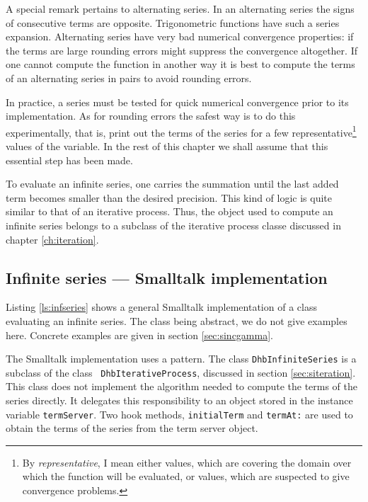 \documentclass[twoside]{book}
\begin{document}
A special remark pertains to alternating series. In an alternating
series the signs of consecutive terms are opposite. Trigonometric
functions have such a series expansion. Alternating series have
very bad numerical convergence properties: if the terms are large
rounding errors might suppress the convergence altogether. If one
cannot compute the function in another way it is best to compute
the terms of an alternating series in pairs to avoid rounding
errors.

In practice, a series must be tested for quick numerical
convergence prior to its implementation. As for rounding errors
the safest way is to do this experimentally, that is, print out
the terms of the series for a few representative\footnote{By {\sl
representative}, I mean either values, which are covering the
domain over which the function will be evaluated, or values, which
are suspected to give convergence problems.} values of the
variable. In the rest of this chapter we shall assume that this
essential step has been made.

To evaluate an infinite series, one carries the summation until
the last added term becomes smaller than the desired precision.
This kind of logic is quite similar to that of an iterative
process. Thus, the object used to compute an infinite series
belongs to a subclass of the iterative process classe discussed in
chapter \ref{ch:iteration}.

\subsection{Infinite series --- Smalltalk  implementation}
\label{sec:sseries}
Listing \ref{ls:infseries} shows a general Smalltalk
implementation of a class evaluating an infinite series. The class
being abstract, we do not give examples here. Concrete examples
are given in section \ref{sec:sincgamma}.

The Smalltalk implementation uses a  pattern.
The class {\tt DhbInfiniteSeries} is a subclass of the class {\tt
DhbIterativeProcess}, discussed in section \ref{sec:siteration}.
This class does not implement the algorithm needed to compute the
terms of the series directly. It delegates this responsibility to
an object stored in the instance variable {\tt termServer}. Two
hook methods, {\tt initialTerm} and {\tt termAt:} are used to
obtain the terms of the series from the term server object.
\end{document}
